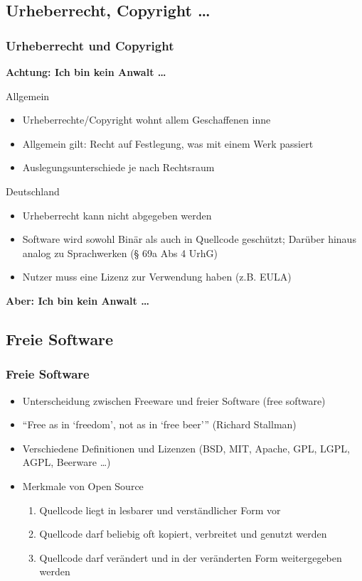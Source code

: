 \documentclass[compress]{beamer}
\begin{document}
\subsection{Urheberrecht, Copyright \dots}
\begin{frame}
	\frametitle{Urheberrecht und Copyright}
	\textbf{Achtung: Ich bin kein Anwalt \dots}
	\pause
	\begin{block}{Allgemein}
		\begin{itemize}
			\item Urheberrechte/Copyright wohnt allem Geschaffenen inne
			\item Allgemein gilt: Recht auf Festlegung, was mit einem Werk 
				passiert
			\item Auslegungsunterschiede je nach Rechtsraum
		\end{itemize}
	\end{block}
	\pause
	\begin{block}{Deutschland}
		\begin{itemize}
			\item Urheberrecht kann nicht abgegeben werden
			\item Software wird sowohl Binär als auch in Quellcode geschützt; 
				Darüber hinaus analog zu Sprachwerken (§ 69a Abs 4 UrhG)
			\item Nutzer muss eine Lizenz zur Verwendung haben (z.B. EULA)
		\end{itemize}
	\end{block}
	\pause
	\textbf{Aber: Ich bin kein Anwalt \dots}
\end{frame}

\subsection{Freie Software}

\begin{frame}
	\frametitle{Freie Software}
	\begin{block}{}
		\begin{itemize}
			\item Unterscheidung zwischen Freeware und freier 
				Software (free software)
			\item “Free as in ‘freedom’, not as in ‘free beer’”
				(Richard Stallman)
			\item Verschiedene Definitionen und Lizenzen (BSD, MIT, 
				Apache, GPL, LGPL, AGPL, Beerware \dots{})
			\item Merkmale von Open Source
			\begin{enumerate}
				\item Quellcode liegt in lesbarer und verständlicher Form vor
				\item Quellcode darf beliebig oft kopiert, verbreitet und 
					genutzt werden
				\item Quellcode darf verändert und in der veränderten Form 
					weitergegeben werden
			\end{enumerate}
		\end{itemize}
	\end{block}
\end{frame}
\end{document}
